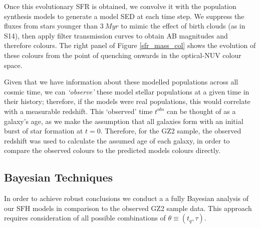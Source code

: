 \documentclass{mn2e}
\begin{document}
Once this evolutionary SFR is obtained, we convolve it with the \citet{BC03} population synthesis models to generate a model SED at each time step. We suppress the fluxes from stars younger than $3~Myr$ to mimic the effect of birth clouds (as in S14), then apply filter transmission curves to obtain AB magnitudes and therefore colours. The right panel of Figure \ref{sfr_mass_col} shows the evolution of these colours from the point of quenching onwards in the optical-NUV colour space.

Given that we have information about these modelled populations across all cosmic time, we can \emph{`observe'} these model stellar populations at a given time in their history; therefore, if the models were real populations, this would correlate with a measurable redshift. This `observed' time $t^{obs}$ can be thought of as a galaxy's age, as we make the assumption that all galaxies form with an initial burst of star formation at $t=0$. Therefore, for the GZ2 sample, the observed redshift was used to calculate the assumed age of each galaxy, in order to compare the observed colours to the predicted models colours directly. 

\subsection{Bayesian Techniques}
In order to achieve robust conclusions we conduct a a fully Bayesian analysis \citep{Sivia, MacKay} of our SFH models in comparison to the observed GZ2 sample data. This approach requires consideration of all possible combinations of $\theta \equiv (t_{q}, \tau)$. %
\end{document}
